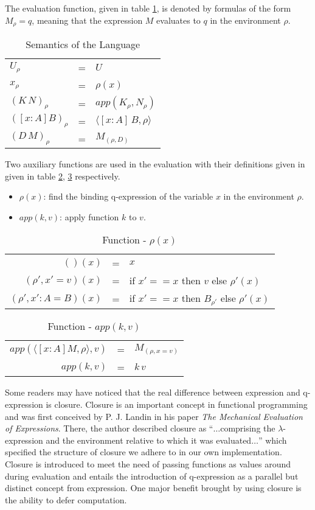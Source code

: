 The evaluation function, given in table \ref{theory:tab:semantics}, is denoted by formulas of the form $M_\rho = q$, meaning that the expression $M$ evaluates to $q$ in the environment $\rho$.
\begin{table}[h]
  \centering
  \begin{tabular}{l l l}
    $U_\rho$ & = & $U$ \\
    $x_\rho$ & = & $\rho(x)$ \\
    $(K\,N)_\rho$ & = & $app(K_\rho, N_\rho)$ \\
    $([x : A]B)_\rho$ & = & $\langle[x : A]\,B, \rho\rangle$ \\
    $(D\,M)_\rho$ & = & $M_{(\rho,D)}$ 
  \end{tabular}
  \caption{Semantics of the Language}
  \label{theory:tab:semantics}
\end{table}

Two auxiliary functions are used in the evaluation with their definitions given in given in table \ref{theory:tab:lookup}, \ref{theory:tab:app} respectively.
\begin{itemize}
\item $\rho(x)$: find the binding q-expression of the variable $x$ in the environment $\rho$.
\item $app(k, v)$: apply function $k$ to $v$. 
\end{itemize}

\begin{table}[h]
  \centering
  \begin{tabular}{r l l}
    $()(x)$ & = & $x$ \\
    $(\rho', x' = v)(x)$ & = & if $x' == x$ then $v$ else $\rho'(x)$ \\
    $(\rho', x' : A = B)(x)$ & = & if $x' == x$ then $B_{\rho'}$ else $\rho'(x)$
  \end{tabular}
  \caption{Function - $\rho(x)$}
  \label{theory:tab:lookup}
\end{table}

\begin{table}[h]
  \centering
  \begin{tabular}{r l l}
    $app(\langle [x : A]M, \rho \rangle, v)$ & = & $M_{(\rho, x = v)}$\\
    $app(k,v)$ & = & $k\,v$
  \end{tabular}
  \caption{Function - $app(k, v)$}
  \label{theory:tab:app}
\end{table}

Some readers may have noticed that the real difference between expression and q-expression is closure. Closure is an important concept in functional programming and was first conceived by P. J. Landin in his paper \emph{The Mechanical Evaluation of Expressions}\cite{landin1964mechanical}. There, the author described closure as ``$\dots$comprising the $\lambda$-expression and the environment relative to which it was evaluated$\dots$'' which specified the structure of closure we adhere to in our own implementation. Closure is introduced to meet the need of passing functions as values around during evaluation and entails the introduction of q-expression as a parallel but distinct concept from expression. One major benefit brought by using closure is the ability to defer computation.

